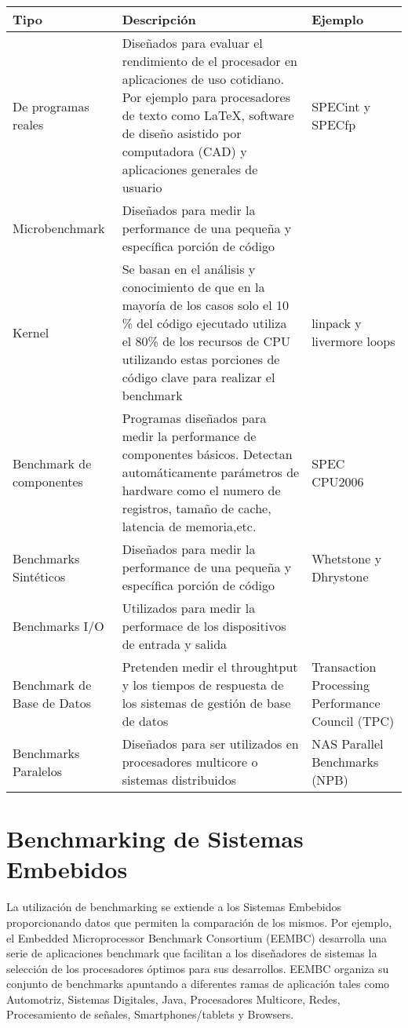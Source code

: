 \begin{tabular}{ p{2.5cm} p{8cm} p{3cm} }
\hline 
\rowcolor[gray]{0.8} Tipo & Descripción & Ejemplo \\
\hline
De programas reales & Diseñados para evaluar el
rendimiento de el procesador en aplicaciones de uso
cotidiano. Por ejemplo para procesadores de texto como \LaTeX, software
de diseño asistido por computadora (CAD) y
aplicaciones generales de usuario & SPECint y SPECfp\\
\hline
Microbenchmark & Diseñados para medir la performance
de una pequeña y específica porción de código \\
\hline
Kernel & Se basan en el análisis y conocimiento de
que en la mayoría de los casos solo el 10 \% del
código ejecutado utiliza el 80\% de los recursos de
CPU utilizando estas porciones de código clave para
realizar el benchmark & linpack y
livermore loops\\
\hline
Benchmark de componentes & Programas diseñados para
medir la performance de componentes básicos. Detectan
automáticamente parámetros de hardware como el numero
de registros, tamaño de cache, latencia de
memoria,etc. & SPEC CPU2006\\
\hline
Benchmarks Sintéticos & Diseñados para medir la
performance de una pequeña y específica porción de
código & Whetstone y Dhrystone\\
\hline
Benchmarks I/O & Utilizados para medir la performace
de los dispositivos de entrada y salida & \\
\hline
Benchmark de Base de Datos & Pretenden medir el
throughtput y los tiempos de respuesta de los sistemas
de gestión de base de datos & Transaction Processing
Performance Council (TPC)\\
\hline
Benchmarks Paralelos & Diseñados para ser utilizados
en procesadores multicore o sistemas distribuidos &
NAS Parallel Benchmarks (NPB)\\
\hline
\end{tabular}
	
\section{Benchmarking de Sistemas Embebidos}

La utilización de benchmarking se extiende a los Sistemas Embebidos
proporcionando datos que permiten la comparación de los mismos. Por
ejemplo, el Embedded Microprocessor Benchmark Consortium (EEMBC)
desarrolla una serie de aplicaciones benchmark que facilitan a los
diseñadores de sistemas la selección de los procesadores óptimos para
sus desarrollos. EEMBC organiza su conjunto de benchmarks apuntando a
diferentes ramas de aplicación tales como Automotriz, Sistemas
Digitales, Java, Procesadores Multicore, Redes, Procesamiento de
señales, Smartphones/tablets y Browsers.
	
